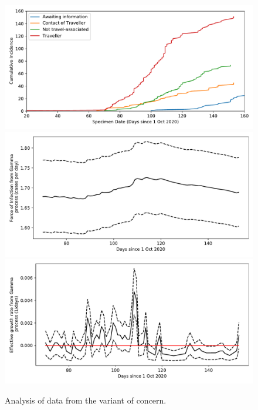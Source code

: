 \documentclass[10pt,a4paper]{article}
\begin{document}
\begin{figure}
\centering
\includegraphics[width=1.0\textwidth]{./voc_c.pdf}\\
\includegraphics[width=1.0\textwidth]{./voc_la.pdf}\\
\includegraphics[width=1.0\textwidth]{./voc_r.pdf}
\caption{Analysis of data from the variant of concern.}
\label{fig:voc}
\end{figure}

\clearpage
\end{document}
